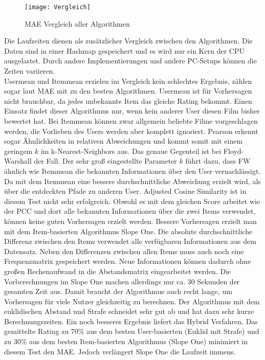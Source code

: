 \begin{figure}[h!]
\centering
\texttt{[image: Vergleich]}
\caption{MAE Vergleich aller Algorithmen}
\label{fig:Vergleich}
\end{figure}
\FloatBarrier
Die Laufzeiten dienen als zusätzlicher Vergleich zwischen den Algorithmen. Die Daten sind in einer Hashmap gespeichert und es wird nur ein Kern der CPU ausgelastet. Durch andere Implementierungen und andere PC-Setups können die Zeiten variieren.\\
Usermean und Itemmean erzielen im Vergleich kein schlechtes Ergebnis, zählen sogar laut MAE mit zu den besten Algorithmen. Usermean ist für Vorhersagen nicht brauchbar, da jedes unbekannte Item das gleiche Rating bekommt. Einen Einsatz findet dieser Algorithmus nur, wenn kein anderer User diesen Film bisher bewertet hat. Bei Itemmean können zwar allgemein beliebte Filme vorgeschlagen werden, die Vorlieben des Users werden aber komplett ignoriert. Pearson erkennt sogar Ähnlichkeiten in relativen Abweichungen und kommt somit mit einem geringem $k$ im k-Nearest-Neighbors aus. Das genaue Gegenteil ist bei Floyd-Warshall der Fall. Der sehr groß eingestellte Parameter $k$ führt dazu, dass FW ähnlich wie Itemmean die bekannten Informationen über den User vernachlässigt. Da mit dem Itemmean eine bessere durchschnittliche Abweichung erzielt wird, als über die entdeckten Pfade zu anderen User. Adjusted Cosine Similarity ist in diesem Test nicht sehr erfolgreich. Obwohl es mit dem gleichen Score arbeitet wie der PCC und dort alle bekannten Informationen über die zwei Items verwendet, können keine guten Vorhersagen erzielt werden. Bessere Vorhersagen erzielt man  mit dem Item-basierten Algorithmus Slope One. Die absolute durchschnittliche Differenz zwischen den Items verwendet alle verfügbaren Informationen aus dem Datensatz. Neben den Differenzen zwischen allen Items muss auch noch eine Frequenzmatrix gespeichert werden. Neue Informationen können dadurch ohne großen Rechenaufwand in die Abstandsmatrix eingearbeitet werden. Die Vorberechnungen im Slope One machen allerdings nur ca. 30 Sekunden der gesamten Zeit aus. Damit braucht der Algorithmus auch recht lange, um Vorhersagen für viele Nutzer gleichzeitig zu berechnen. Der Algorithmus mit dem euklidischen Abstand und Strafe schneidet sehr gut ab und hat dazu sehr kurze Berechnungszeiten. Ein noch besseres Ergebnis liefert das Hybrid Verfahren. Das gemittelte Rating zu 70\% aus dem besten User-basierten (Euklid mit Strafe) und zu 30\% aus dem besten Item-basierten Algorithmus (Slope One) minimiert in diesem Test den MAE. Jedoch verlängert Slope One die Laufzeit immens.\\

